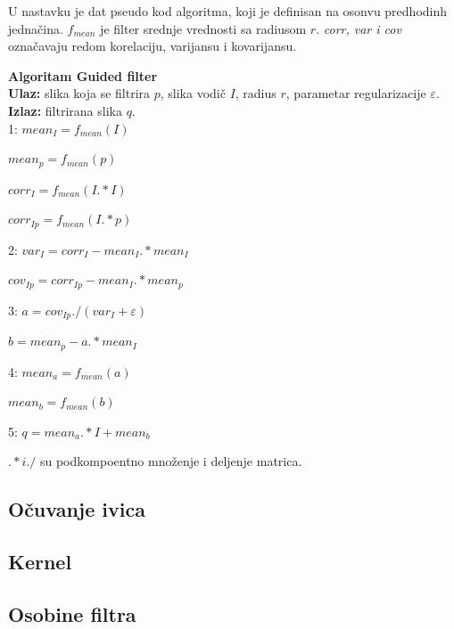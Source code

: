 \documentclass[a4paper,12pt,titlepage]{article}
\begin{document}
U nastavku je dat pseudo kod algoritma, koji je definisan na osonvu predhodinh jednačina. $f_{mean}$ je filter srednje vrednosti sa radiusom $r$. \emph{corr, var i cov} označavaju redom korelaciju, varijansu i kovarijansu. 

\textbf{Algoritam Guided filter}\\

\textbf{Ulaz:} slika koja se filtrira $p$, slika vodič $I$, radius $r$, parametar regularizacije $\varepsilon$.\\

\textbf{Izlaz:} filtrirana slika $q$.\\

1: $mean_I = f_{mean}(I)$

\hspace{4mm} $mean_p = f_{mean}(p)$

\hspace{4mm} $corr_I = f_{mean}(I .* I)$

\hspace{4mm} $corr_{Ip} = f_{mean}(I .* p)$

2: $var_I = corr_I - mean_I .* mean_I$

\hspace{4mm}  $cov_{Ip} = corr_{Ip} - mean_I .* mean_p$

3: $a = cov_{Ip} ./ (var_I + \varepsilon)$

\hspace{4mm} $b = mean_p - a .*  mean_I$

4: $mean_a = f_{mean}(a)$

\hspace{4mm} $mean_b = f_{mean}(b)$

5: $q = mean_a .* I + mean_b$

$ .*  i  ./ $ su podkompoentno množenje i deljenje matrica.

    

\subsection{Očuvanje ivica}%

\subsection{Kernel}%

\subsection{Osobine filtra}%
\end{document}
